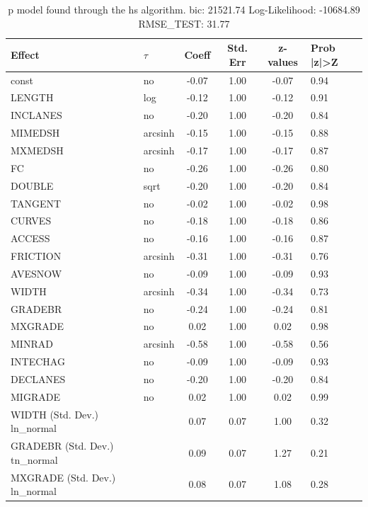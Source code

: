 \begin{table}
	\caption{p model found through the hs algorithm. bic: 21521.74 Log-Likelihood: -10684.89 RMSE_TEST: 31.77}
	\begin{center}
		\begin{tabular}{|l|l|c|c|c|l|}
			\hline
			Effect & $\tau$ & Coeff & Std. Err & z-values & Prob |z|>Z \\
			\hline
			const & no & -0.07 & 1.00 & -0.07 & 0.94 \\
			\hline
			LENGTH & log & -0.12 & 1.00 & -0.12 & 0.91 \\
			\hline
			INCLANES & no & -0.20 & 1.00 & -0.20 & 0.84 \\
			\hline
			MIMEDSH & arcsinh & -0.15 & 1.00 & -0.15 & 0.88 \\
			\hline
			MXMEDSH & arcsinh & -0.17 & 1.00 & -0.17 & 0.87 \\
			\hline
			FC & no & -0.26 & 1.00 & -0.26 & 0.80 \\
			\hline
			DOUBLE & sqrt & -0.20 & 1.00 & -0.20 & 0.84 \\
			\hline
			TANGENT & no & -0.02 & 1.00 & -0.02 & 0.98 \\
			\hline
			CURVES & no & -0.18 & 1.00 & -0.18 & 0.86 \\
			\hline
			ACCESS & no & -0.16 & 1.00 & -0.16 & 0.87 \\
			\hline
			FRICTION & arcsinh & -0.31 & 1.00 & -0.31 & 0.76 \\
			\hline
			AVESNOW & no & -0.09 & 1.00 & -0.09 & 0.93 \\
			\hline
			WIDTH & arcsinh & -0.34 & 1.00 & -0.34 & 0.73 \\
			\hline
			GRADEBR & no & -0.24 & 1.00 & -0.24 & 0.81 \\
			\hline
			MXGRADE & no & 0.02 & 1.00 & 0.02 & 0.98 \\
			\hline
			MINRAD & arcsinh & -0.58 & 1.00 & -0.58 & 0.56 \\
			\hline
			INTECHAG & no & -0.09 & 1.00 & -0.09 & 0.93 \\
			\hline
			DECLANES & no & -0.20 & 1.00 & -0.20 & 0.84 \\
			\hline
			MIGRADE & no & 0.02 & 1.00 & 0.02 & 0.99 \\
			\hline
			WIDTH (Std. Dev.) ln_normal &  & 0.07 & 0.07 & 1.00 & 0.32 \\
			\hline
			GRADEBR (Std. Dev.) tn_normal &  & 0.09 & 0.07 & 1.27 & 0.21 \\
			\hline
			MXGRADE (Std. Dev.) ln_normal &  & 0.08 & 0.07 & 1.08 & 0.28 \\

\end{tabular}
\end{center}
\end{table}
